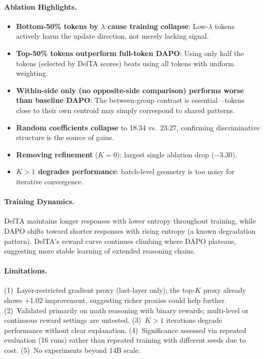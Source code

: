\documentclass[11pt,a4paper]{article}
\begin{document}
\paragraph{Ablation Highlights.}
\begin{itemize}[nosep]
    \item \textbf{Bottom-50\% tokens by $\lambda$ cause training collapse}: Low-$\lambda$ tokens actively harm the update direction, not merely lacking signal.
    \item \textbf{Top-50\% tokens outperform full-token DAPO}: Using only half the tokens (selected by DelTA scores) beats using all tokens with uniform weighting.
    \item \textbf{Within-side only (no opposite-side comparison) performs worse than baseline DAPO}: The between-group contrast is essential---tokens close to their own centroid may simply correspond to shared patterns.
    \item \textbf{Random coefficients collapse} to 18.34 vs.\ 23.27, confirming discriminative structure is the source of gains.
    \item \textbf{Removing refinement} ($K=0$): largest single ablation drop ($-3.30$).
    \item \textbf{$K > 1$ degrades performance}: batch-level geometry is too noisy for iterative convergence.
\end{itemize}

\paragraph{Training Dynamics.}
DelTA maintains longer responses with lower entropy throughout training, while DAPO shifts toward shorter responses with rising entropy (a known degradation pattern). DelTA's reward curve continues climbing where DAPO plateaus, suggesting more stable learning of extended reasoning chains.

\paragraph{Limitations.}
(1)~Layer-restricted gradient proxy (last-layer only); the top-$K$ proxy already shows +1.02 improvement, suggesting richer proxies could help further. (2)~Validated primarily on math reasoning with binary rewards; multi-level or continuous reward settings are untested. (3)~$K > 1$ iterations degrade performance without clear explanation. (4)~Significance assessed via repeated evaluation (16 runs) rather than repeated training with different seeds due to cost. (5)~No experiments beyond 14B scale.
\end{document}
